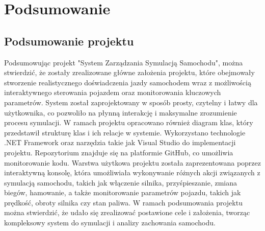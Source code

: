﻿%
\chapter{Podsumowanie}
\section{Podsumowanie projektu}

Podsumowując projekt "System Zarządzania Symulacją Samochodu", można stwierdzić, że zostały zrealizowane główne założenia projektu, które obejmowały stworzenie realistycznego doświadczenia jazdy samochodem wraz z możliwością interaktywnego sterowania pojazdem oraz monitorowania kluczowych parametrów. System został zaprojektowany w sposób prosty, czytelny i łatwy dla użytkownika, co pozwoliło na płynną interakcję i maksymalne zrozumienie procesu symulacji. W ramach projektu opracowano również diagram klas, który przedstawił strukturę klas i ich relacje w systemie. Wykorzystano technologie .NET Framework oraz narzędzia takie jak Visual Studio do implementacji projektu. Repozytorium znajduje się na platformie GitHub, co umożliwia monitorowanie kodu. Warstwa użytkowa projektu została zaprezentowana poprzez interaktywną konsolę, która umożliwiała wykonywanie różnych akcji związanych z symulacją samochodu, takich jak włączenie silnika, przyśpieszanie, zmiana biegów, hamowanie, a także monitorowanie parametrów pojazdu, takich jak prędkość, obroty silnika czy stan paliwa. W ramach podsumowania projektu można stwierdzić, że udało się zrealizować postawione cele i założenia, tworząc kompleksowy system do symulacji i analizy zachowania samochodu. 


